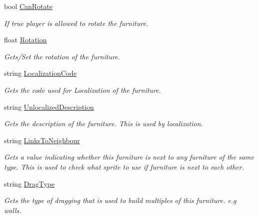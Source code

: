 \begin{DoxyCompactItemize}
bool \hyperlink{class_furniture_a48015edd488d45e215e358638d088939}{Can\+Rotate}
\begin{DoxyCompactList}\small\item\em If true player is allowed to rotate the furniture. \end{DoxyCompactList}\item 
float \hyperlink{class_furniture_ac5af988a7d8e9c91bd8f09ef6c9e95e7}{Rotation}
\begin{DoxyCompactList}\small\item\em Gets/\+Set the rotation of the furniture. \end{DoxyCompactList}\item 
string \hyperlink{class_furniture_a9994c5ec8b832590778692fdff7731ee}{Localization\+Code}
\begin{DoxyCompactList}\small\item\em Gets the code used for Localization of the furniture. \end{DoxyCompactList}\item 
string \hyperlink{class_furniture_aa9e0fe9e4a5b51d86a76d3e11f79f58a}{Unlocalized\+Description}
\begin{DoxyCompactList}\small\item\em Gets the description of the furniture. This is used by localization. \end{DoxyCompactList}\item 
string \hyperlink{class_furniture_a5a41f977566d47fb634921bc799fc40a}{Links\+To\+Neighbour}
\begin{DoxyCompactList}\small\item\em Gets a value indicating whether this furniture is next to any furniture of the same type. This is used to check what sprite to use if furniture is next to each other. \end{DoxyCompactList}\item 
string \hyperlink{class_furniture_ae368a4dd184283499a882e715b8a8388}{Drag\+Type}
\begin{DoxyCompactList}\small\item\em Gets the type of dragging that is used to build multiples of this furniture. e.\+g walls. \end{DoxyCompactList}\item 

\end{DoxyCompactItemize}

